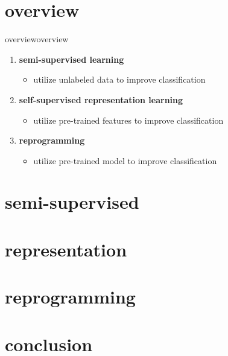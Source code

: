     \section{overview}        
        \begin{frame}{overview}{overview}
            \begin{enumerate}
                \item   \textbf{semi-supervised learning }
                    \begin{itemize}
                        \item   utilize unlabeled data to improve classification
                    \end{itemize}
                \bigskip
                \item   \textbf{self-supervised representation learning }
                    \begin{itemize}
                        \item   utilize pre-trained features to improve classification
                    \end{itemize}
                \bigskip
                \item   \textbf{reprogramming} 
                    \begin{itemize}
                        \item   utilize pre-trained model to improve classification
                    \end{itemize}
            \end{enumerate}
        \end{frame}

    
    \section{semi-supervised}
        
    
    \section{representation}
        
    
    \section{reprogramming}
        

    \section{conclusion}
        
        



